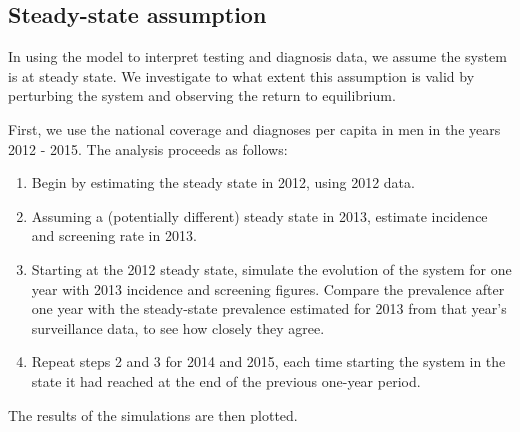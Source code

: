 \documentclass{article}
\providecommand{\tightlist}{%
      \setlength{\itemsep}{0pt}\setlength{\parskip}{0pt}}
\begin{document}
    \subsection{Steady-state assumption}\label{steady-state-assumption}

In using the model to interpret testing and diagnosis data, we assume
the system is at steady state. We investigate to what extent this
assumption is valid by perturbing the system and observing the return to
equilibrium.

First, we use the national coverage and diagnoses per capita in men in
the years 2012 - 2015. The analysis proceeds as follows:

\begin{enumerate}
\def\labelenumi{\arabic{enumi}.}
\tightlist
\item
  Begin by estimating the steady state in 2012, using 2012 data.
\item
  Assuming a (potentially different) steady state in 2013, estimate
  incidence and screening rate in 2013.
\item
  Starting at the 2012 steady state, simulate the evolution of the
  system for one year with 2013 incidence and screening figures. Compare
  the prevalence after one year with the steady-state prevalence
  estimated for 2013 from that year's surveillance data, to see how
  closely they agree.
\item
  Repeat steps 2 and 3 for 2014 and 2015, each time starting the system
  in the state it had reached at the end of the previous one-year
  period.
\end{enumerate}

The results of the simulations are then plotted.
\end{document}
